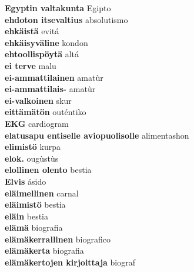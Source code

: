\textbf{ Egyptin valtakunta  } Egipto \\
\textbf{ ehdoton itsevaltius  } absolutismo \\
\textbf{ ehkäistä  } evitá \\
\textbf{ ehkäisyväline  } kondon \\
\textbf{ ehtoollispöytä  } altá \\
\textbf{ ei terve  } malu \\
\textbf{ ei-ammattilainen  } amatùr \\
\textbf{ ei-ammattilais-  } amatùr \\
\textbf{ ei-valkoinen  } skur \\
\textbf{ eittämätön  } outéntiko \\
\textbf{ EKG  } cardiogram \\
\textbf{ elatusapu entiselle aviopuolisolle  } alimentashon \\
\textbf{ elimistö  } kurpa \\
\textbf{ elok.  } ougùstùs \\
\textbf{ elollinen olento  } bestia \\
\textbf{ Elvis  } ásido \\
\textbf{ eläimellinen  } carnal \\
\textbf{ eläimistö  } bestia \\
\textbf{ eläin  } bestia \\
\textbf{ elämä  } biografia \\
\textbf{ elämäkerrallinen  } biografico \\
\textbf{ elämäkerta  } biografia \\
\textbf{ elämäkertojen kirjoittaja  } biograf \\
